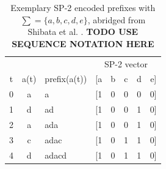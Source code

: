 \begin{table}
    \centering
    \begin{tabular}{cclccccc}
        \hline
          &      &              & \multicolumn{5}{c}{SP-2 vector}\\
        t & a(t) & prefix(a(t)) & [a & b & c & d & e]\\
        \hline
        0 & a    & a            & [1 & 0 & 0 & 0 & 0]\\
        1 & d    & ad           & [1 & 0 & 0 & 1 & 0]\\
        2 & a    & ada          & [1 & 0 & 0 & 1 & 0]\\
        3 & c    & adac         & [1 & 0 & 1 & 1 & 0]\\
        4 & d    & adacd        & [1 & 0 & 1 & 1 & 0]\\
        \hline
    \end{tabular}
    \caption{Exemplary SP-2 encoded prefixes with $\sum=\{a,b,c,d,e\}$, abridged from Shibata et al.  \cite{shibata2016bipartite}. \textbf{TODO USE SEQUENCE NOTATION HERE}}
    \label{tab:sp2-encoding}
\end{table}